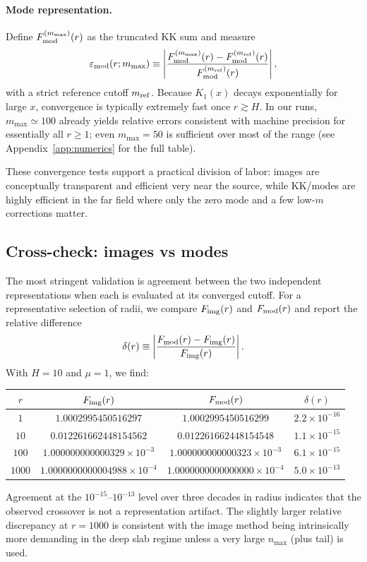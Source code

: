 \documentclass[11pt]{article}
\begin{document}
\paragraph{Mode representation.}
Define $F_{\rm mod}^{(m_{\max})}(r)$ as the truncated KK sum and measure
\begin{equation}
  \varepsilon_{\rm mod}(r;m_{\max}) \equiv
  \left|\frac{F_{\rm mod}^{(m_{\max})}(r)-F_{\rm mod}^{(m_{\rm ref})}(r)}{F_{\rm mod}^{(m_{\rm ref})}(r)}\right|,
\end{equation}
with a strict reference cutoff $m_{\rm ref}$.
Because $K_1(x)$ decays exponentially for large $x$, convergence is typically extremely fast once
$r\gtrsim H$.  In our runs, $m_{\max}\simeq 100$ already yields relative errors consistent with
machine precision for essentially all $r\ge 1$; even $m_{\max}=50$ is sufficient over most of the
range (see Appendix~\ref{app:numerics} for the full table).

These convergence tests support a practical division of labor: images are conceptually transparent
and efficient very near the source, while KK/modes are highly efficient in the far field where only
the zero mode and a few low-$m$ corrections matter.

\subsection{Cross-check: images vs modes}
\label{sec:numerics_crosscheck}

The most stringent validation is agreement between the two independent representations when each is
evaluated at its converged cutoff.  For a representative selection of radii, we compare
$F_{\rm img}(r)$ and $F_{\rm mod}(r)$ and report the relative difference
\begin{equation}
  \delta(r)\equiv
  \left|\frac{F_{\rm mod}(r)-F_{\rm img}(r)}{F_{\rm img}(r)}\right|.
\end{equation}
With $H=10$ and $\mu=1$, we find:
\begin{center}
\begin{tabular}{c|ccc}
\hline
$r$ & $F_{\rm img}(r)$ & $F_{\rm mod}(r)$ & $\delta(r)$ \\
\hline
$1$    & $1.0002995450516297$ & $1.0002995450516299$ & $2.2\times 10^{-16}$ \\
$10$   & $0.012261662448154562$ & $0.012261662448154548$ & $1.1\times 10^{-15}$ \\
$100$  & $1.000000000000329\times 10^{-3}$ & $1.000000000000323\times 10^{-3}$ & $6.1\times 10^{-15}$ \\
$1000$ & $1.0000000000004988\times 10^{-4}$ & $1.0000000000000000\times 10^{-4}$ & $5.0\times 10^{-13}$ \\
\hline
\end{tabular}
\end{center}
Agreement at the $10^{-15}$--$10^{-13}$ level over three decades in radius indicates that the
observed crossover is not a representation artifact.  The slightly larger relative discrepancy at
$r=1000$ is consistent with the image method being intrinsically more demanding in the deep slab
regime unless a very large $n_{\max}$ (plus tail) is used.
\end{document}
